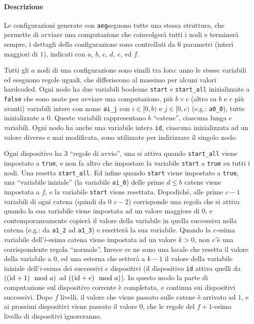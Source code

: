 \documentclass[12pt, a4paper]{article}
\newcommand{\aeg}[0]{{\lstinline{aeg}}}
\begin{document}
\paragraph{Descrizione}\label{aeg:descrizione}

Le configurazioni generate con \aeg seguono tutte una stessa struttura, che permette di avviare una computazione che coinvolgerà tutti i nodi e terminerà sempre, i dettagli della configurazione sono controllati da $6$ parametri (interi maggiori di $1$), indicati con $a$, $b$, $c$, $d$, $e$, ed $f$.

Tutti gli $a$ nodi di una configurazione sono simili tra loro: anno le stesse variabili ed eseguono regole uguali, che differiscono al massimo per alcuni valori hardcoded. Ogni nodo ha due variabili booleane \lstinline{start} e \lstinline{start_all} inizializzate a \lstinline{false} che sono usate per avviare una computazione, più $b\times c$ (altro su $b$ e $c$ più avanti) variabili intere con nome \lstinline{ai_j} con $i\in [0,b)$ e $j\in [0,c)$ (e.g.: \lstinline{a0_0}), tutte inizializzate a $0$. Queste variabili rappresentano $b$ ``catene'', ciascuna lunga $c$ variabili. Ogni nodo ha anche una variabile intera \lstinline{id}, ciascuna inizializzata ad un valore diverso e mai modificata, sono utilizzate per indirizzare il singolo nodo.

Ogni dispositivo ha 3 ``regole di avvio'', una si attiva quando \lstinline{start_all} viene impostato a \lstinline{true}, e non fa altro che impostare la variabile \lstinline{start} a \lstinline{true} su tutti i nodi. Una resetta \lstinline{start_all}. Ed infine quando \lstinline{start} viene impostato a \lstinline{true}, una ``variabile iniziale'' (la variabile \lstinline{ai_0}) delle prime $d\leq b$ catene viene impostata a $f$, e la variabile \lstinline{start} viene resettata.
Dopodiché, alle prime $c-1$ variabili di ogni catena (quindi da $0$ $c-2$) corrisponde una regola che si attiva quando la sua variabile viene impostata ad un valore maggiore di $0$, e contemporaneamente copierà il valore della variabile in quella successiva nella catena (e.g.: da \lstinline{a1_2} ad \lstinline{a1_3}) e resetterà la sua variabile.
Quando la $c$-esima variabile dell'$i$-esima catena viene impostata ad un valore $k>0$, non c'è una corrispondente regola ``normale''. Invece ce ne sono una locale che resetta il valore della variabile a $0$, ed una esterna che setterà a $k-1$ il valore della variabile iniziale dell'$i$-esima dei successivi $e$ dispositivi (il dispositivo \lstinline{id} attiva quelli da $((\text{\lstinline{id}}+1)\mod a)$ ad $((\text{\lstinline{id}}+e)\mod a)$). In questo modo la parte di computazione sul dispositivo corrente è completata, e continua sui dispositivi successivi.
Dopo $f$ livelli, il valore che viene passato sulle catene è arrivato ad $1$, e ai prossimi dispositivi viene passato il valore $0$, che le regole del $f+1$-esimo livello di dispositivi ignoreranno.
\end{document}
